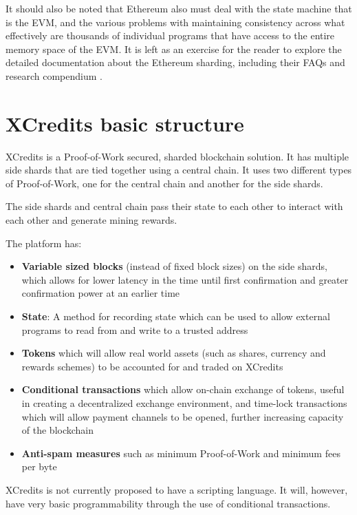 \documentclass[a4paper,12pt]{article}
\begin{document}
It should also be noted that Ethereum also must deal with the state machine that is the EVM, and the various problems with maintaining consistency across what effectively are thousands of individual programs that have access to the entire memory space of the EVM. It is left as an exercise for the reader to explore the detailed documentation about the Ethereum sharding, including their FAQs \cite{ethereumshardingFaqs} and research compendium \cite{ethereumResearchCompendium}.







\newpage
\section{XCredits basic structure}
XCredits is a Proof-of-Work secured, sharded blockchain solution. It has multiple side shards that are tied together using a central chain. It uses two different types of Proof-of-Work, one for the central chain and another for the side shards. 

The side shards and central chain pass their state to each other to interact with each other and generate mining rewards. 

The platform has:
\begin{itemize}
  \item \textbf{Variable sized blocks} (instead of fixed block sizes) on the side shards, which allows for lower latency in the time until first confirmation and greater confirmation power at an earlier time 
  \item \textbf{State}: A method for recording state which can be used to allow external programs to read from and write to a trusted address
  \item \textbf{Tokens} which will allow real world assets (such as shares, currency and rewards schemes) to be accounted for and traded on XCredits
  \item \textbf{Conditional transactions} which allow on-chain exchange of tokens, useful in creating a decentralized exchange environment, and time-lock transactions which will allow payment channels to be opened, further increasing capacity of the blockchain
  \item \textbf{Anti-spam measures} such as minimum Proof-of-Work and minimum fees per byte
\end{itemize}

XCredits is not currently proposed to have a scripting language. It will, however, have very basic programmability through the use of conditional transactions. 
\end{document}
